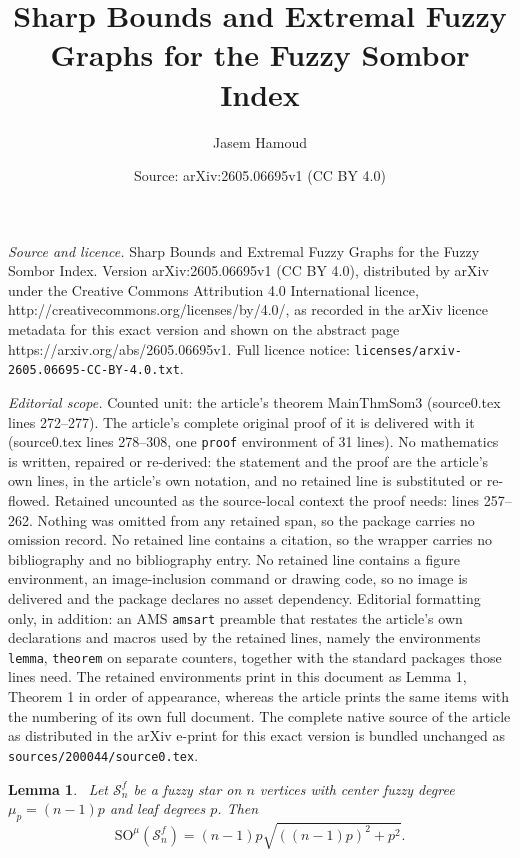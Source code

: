 \documentclass[10pt,a4paper]{amsart}
\title{Sharp Bounds and Extremal Fuzzy Graphs for the Fuzzy Sombor Index}
\author{Jasem Hamoud}
\date{Source: arXiv:2605.06695v1 (CC BY 4.0)}
\newtheorem{lemma}{Lemma}
\newcommand{\SN}{\mathcal{S}}
\newcommand{\SOG}{\mathrm{SO}^{\mu}}
\begin{document}
\maketitle

\noindent\emph{Source and licence.} Sharp Bounds and Extremal Fuzzy Graphs for the Fuzzy Sombor Index. Version arXiv:2605.06695v1 (CC BY 4.0), distributed by arXiv under the Creative Commons Attribution 4.0 International licence, http://creativecommons.org/licenses/by/4.0/, as recorded in the arXiv licence metadata for this exact version and shown on the abstract page https://arxiv.org/abs/2605.06695v1. Full licence notice: \texttt{licenses/arxiv-2605.06695-CC-BY-4.0.txt}.\par\smallskip

\noindent\textit{Editorial scope.} Counted unit: the article's theorem MainThmSom3 (source0.tex lines 272--277). The article's complete original proof of it is delivered with it (source0.tex lines 278--308, one \texttt{proof} environment of 31 lines). No mathematics is written, repaired or re-derived: the statement and the proof are the article's own lines, in the article's own notation, and no retained line is substituted or re-flowed.  Retained uncounted as the source-local context the proof needs: lines 257--262.  Nothing was omitted from any retained span, so the package carries no omission record.  No retained line contains a citation, so the wrapper carries no bibliography and no bibliography entry.  No retained line contains a figure environment, an image-inclusion command or drawing code, so no image is delivered and the package declares no asset dependency.  Editorial formatting only, in addition: an AMS \texttt{amsart} preamble that restates the article's own declarations and macros used by the retained lines, namely the environments \texttt{lemma}, \texttt{theorem} on separate counters, together with the standard packages those lines need.  The retained environments print in this document as Lemma 1, Theorem 1 in order of appearance, whereas the article prints the same items with the numbering of its own full document.  The complete native source of the article as distributed in the arXiv e-print for this exact version is bundled unchanged as \texttt{sources/200044/source0.tex}.
\begin{lemma}~\label{lemstar01}
Let $\SN_n^f$ be a fuzzy star on $n$ vertices with center fuzzy degree $\mu_p=(n-1)p$ and leaf degrees $p$. Then
\[
\SOG(\SN_n^f)=(n-1) p \sqrt{ ((n-1)p)^2+p^2}.
\]
\end{lemma}
\end{document}
